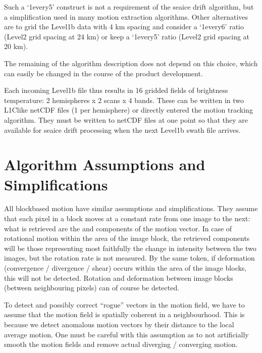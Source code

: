 \documentclass[letterpaper,10pt,english]{jupyterBook}
\begin{document}
\sphinxAtStartPar
Such a ‘1\sphinxhyphen{}every\sphinxhyphen{}5’ construct is not a requirement of the sea\sphinxhyphen{}ice drift algorithm, but a simplification used in many motion extraction algorithms. Other alternatives are to grid the Level\sphinxhyphen{}1b data with
4 km spacing and consider a ‘1\sphinxhyphen{}every\sphinxhyphen{}6’ ratio (Level\sphinxhyphen{}2 grid spacing at 24 km) or keep a ‘1\sphinxhyphen{}every\sphinxhyphen{}5’ ratio (Level\sphinxhyphen{}2 grid spacing at 20 km).

\sphinxAtStartPar
The remaining of the algorithm description does not depend on this choice, which can easily be changed in the course of the product development.

\sphinxAtStartPar
Each incoming Level\sphinxhyphen{}1b file thus results in 16 gridded fields of brightness temperature: 2 hemispheres x 2 scans x 4 bands. These can be written in two L1C\sphinxhyphen{}like netCDF files (1 per hemisphere) or
directly entered the motion tracking algorithm. They must be written to netCDF files at one point so that they are available for sea\sphinxhyphen{}ice drift processing when the next Level\sphinxhyphen{}1b swath file arrives.


\section{Algorithm Assumptions and Simplifications}
\label{\detokenize{baseline_algorithm_definition:algorithm-assumptions-and-simplifications}}
\sphinxAtStartPar
All block\sphinxhyphen{}based motion have similar assumptions and simplifications. They assume that each pixel in a block moves at a constant rate from one image to the next: what is retrieved are the  and 
components of the motion vector. In case of rotational motion within the area of the image block, the retrieved components will be those representing most faithfully the change in intensity between
the two images, but the rotation rate is not measured. By the same token, if deformation (convergence / divergence / shear) occurs within the area of the image blocks, this will not be detected.
Rotation and deformation between image blocks (between neighbouring pixels) can of course be detected.

\sphinxAtStartPar
To detect and possibly correct “rogue” vectors in the motion field, we have to assume that the motion field is spatially coherent in a neighbourhood. This is because we detect anomalous motion vectors
by their distance to the local average motion. One must be careful with this assumption as to not artificially smooth the motion fields and remove actual diverging / converging motion.
\end{document}
